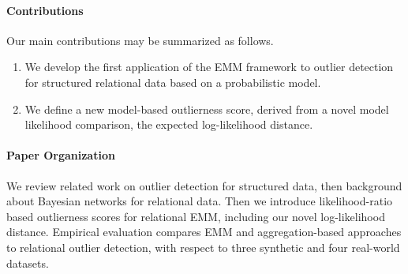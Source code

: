 {\paragraph{Contributions} Our main contributions may be 
summarized as follows.

\begin{enumerate} 
	\item We develop the first application of the EMM framework to outlier detection for structured relational data based on a probabilistic model. 
	\item We define a new model-based outlierness score, derived from a novel model likelihood comparison, the expected log-likelihood distance.  %
\end{enumerate}
				
%				

\paragraph{Paper Organization} We review related work on outlier detection for structured data, then background about Bayesian networks for relational data. Then we introduce likelihood-ratio based outlierness scores for relational EMM, including our novel log-likelihood distance. 
Empirical evaluation compares EMM and aggregation-based approaches to relational outlier detection, with respect to three synthetic and four real-world datasets.

}
